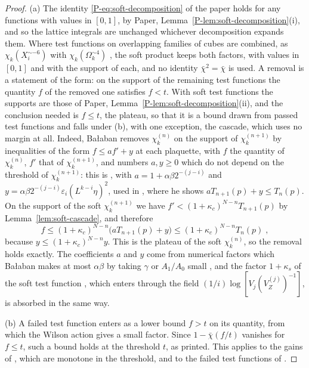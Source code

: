 \documentclass[11pt]{preprint}
\numberwithin{equation}{section}
\theoremstyle{definition}
\theoremstyle{remark}
\theoremstyle{plain}
\begin{document}
\begin{proof}
(a) The identity \eqref{P-eq:soft-decomposition} of the paper holds for any functions with values in $[0, 1]$, by Paper, Lemma~\ref{P-lem:soft-decomposition}(i), and so the lattice integrals are unchanged whichever decomposition expands them. Where test functions on overlapping families of cubes are combined, as $\chi_k(X_i^{\sim-6})$ with $\chi_k(\Omega_k^{\sim4})$ \cite[p.~378]{BalabanLFR2}, the soft product keeps both factors, with values in $[0, 1]$ and with the support of each, and no identity $\bar\chi^2 = \bar\chi$ is used. A removal is a statement of the form: on the support of the remaining test functions the quantity $f$ of the removed one satisfies $f < t$. With soft test functions the supports are those of Paper, Lemma~\ref{P-lem:soft-decomposition}(ii), and the conclusion needed is $f \leq t$, the plateau, so that it is a bound drawn from passed test functions and falls under (b), with one exception, the cascade, which uses no margin at all. Indeed, Ba{\l}aban removes $\chi_k^{(n)}$ on the support of $\chi_k^{(n+1)}$ by inequalities of the form $f \leq af' + y$ at each plaquette, with $f$ the quantity of $\chi_k^{(n)}$, $f'$ that of $\chi_k^{(n+1)}$, and numbers $a, y \geq 0$ which do not depend on the threshold of $\chi_k^{(n+1)}$: this is \cite[(1.48), p.~186]{BalabanLFR1}, with $a = 1 + \alpha\beta2^{-(j-i)}$ and $y = \alpha\beta2^{-(j-i)}\varepsilon_i(L^{k-i}\eta)^2$, used in \cite[(1.50)--(1.52), p.~187]{BalabanLFR1}, where he shows $aT_{n+1}(p) + y \leq T_n(p)$. On the support of the soft $\chi_k^{(n+1)}$ we have $f' < (1 + \kappa_c)^{N-n}T_{n+1}(p)$ by Lemma~\ref{lem:soft-cascade}, and therefore
\begin{equation}\label{eq:cascade-removal}
    f \leq (1 + \kappa_c)^{N-n}\bigl(aT_{n+1}(p) + y\bigr) \leq (1 + \kappa_c)^{N-n}T_n(p)\;,
\end{equation}
because $y \leq (1 + \kappa_c)^{N-n}y$. This is the plateau of the soft $\chi_k^{(n)}$, so the removal holds exactly. The coefficients $a$ and $y$ come from numerical factors which Ba{\l}aban makes at most $\alpha\beta$ by taking $\gamma$ or $A_1/A_0$ small \cite[p.~186]{BalabanLFR1}, and the factor $1 + \kappa_s$ of the soft test function \cite[(1.27)]{BalabanLFR1}, which enters through the field $(1/i)\log[V_j(V^{(j)}_Z)^{-1}]$, is absorbed in the same way.

(b) A failed test function enters as a lower bound $f > t$ on its quantity, from which the Wilson action gives a small factor. Since $1 - \bar\chi(f/t)$ vanishes for $f \leq t$, such a bound holds at the threshold $t$, as printed. This applies to the gains of \cite[pp.~380--381]{BalabanLFR2}, which are monotone in the threshold, and to the failed test functions of \cite{BalabanCRE,BalabanLFR1}.


\end{proof}
\end{document}
